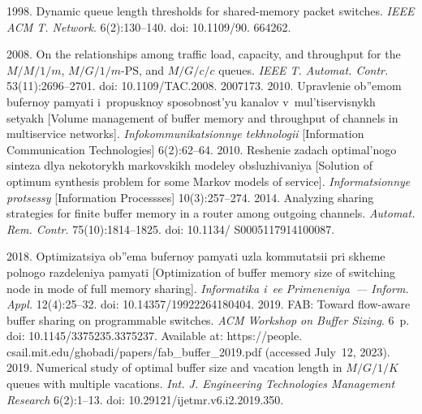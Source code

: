 \begin{multicols}{2}
{{\begin{thebibliography}{99}
 1998. Dynamic queue length thresholds for shared-memory 
packet switches. \textit{IEEE ACM T. Network}. 6(2):130--140. doi: 10.1109/90. 664262.

 2008. On the relationships among traffic load, capacity, and throughput for the $M/M/1/m$, 
$M/G/1/m\mbox{-}\mathrm{PS}$, and $M/G/c/c$ queues. \textit{IEEE T. Automat. Contr.} 53(11):2696--2701. doi: 
10.1109/TAC.2008. 2007173.
 2010. Uprav\-le\-nie ob''\-emom bu\-fer\-noy pa\-mya\-ti i~pro\-pusk\-noy  
spo\-sob\-nost'yu ka\-na\-lov v~mul'\-ti\-ser\-vis\-nykh se\-tyakh [Volume management of buffer memory 
and throughput of channels in multiservice networks]. \textit{In\-fo\-kom\-mu\-ni\-ka\-tsi\-on\-nye  
tekh\-no\-lo\-gii} [Information Communication Technologies] 6(2):62--64.
 2010. Re\-she\-nie za\-dach op\-ti\-mal'\-no\-go sin\-te\-za dlya ne\-ko\-to\-rykh 
mar\-kov\-skikh mo\-de\-ley ob\-slu\-zhi\-va\-niya [Solution of optimum synthesis problem for some Markov 
models of service]. \textit{In\-for\-ma\-tsi\-on\-nye pro\-tses\-sy} [Information Processses] 10(3):257--274.
 2014. Analyzing sharing strategies for finite buffer memory in a router among 
outgoing channels. \textit{Automat. Rem. Contr.} 75(10):1814--1825. doi: 10.1134/ S0005117914100087.



 2018. Op\-ti\-mi\-za\-tsiya ob''\-ema bu\-fer\-noy pa\-mya\-ti uz\-la  
kom\-mu\-ta\-tsii pri skhe\-me pol\-no\-go raz\-de\-le\-niya pa\-mya\-ti [Optimization of buffer memory size 
of switching node in mode of full memory sharing]. \textit{Informatika i~ee Primeneniya~--- Inform. Appl.} 
12(4):25--32. doi: 10.14357/19922264180404.
 2019. FAB: Toward flow-aware buffer sharing on 
programmable switches. \textit{ACM Workshop on Buffer Sizing}. 6~p. doi: 10.1145/3375235.3375237. 
Available at:  {\sf https://people. csail.mit.edu/ghobadi/papers/fab\_buffer\_2019.pdf} (accessed July~12, 2023).
 2019. Numerical study of optimal buffer size and vacation length in $M/G/1/K$ queues with 
multiple vacations. \textit{Int. J. Engineering Technologies Management Research} 6(2):1--13. doi: 
10.29121/ijetmr.v6.i2.2019.350.


\end{thebibliography}}}
\end{multicols}
